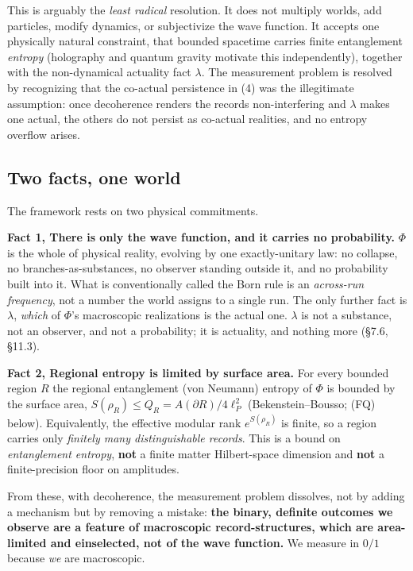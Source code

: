 \documentclass[11pt,a4paper]{article}
\begin{document}
This is arguably the \emph{least radical} resolution. It does not multiply worlds, add particles, modify dynamics, or subjectivize the wave function. It accepts one physically natural constraint, that bounded spacetime carries finite entanglement \emph{entropy} (holography and quantum gravity motivate this independently), together with the non-dynamical actuality fact $\lambda$. The measurement problem is resolved by recognizing that the co-actual persistence in (4) was the illegitimate assumption: once decoherence renders the records non-interfering and $\lambda$ makes one actual, the others do not persist as co-actual realities, and no entropy overflow arises.

\subsection{Two facts, one world}

The framework rests on two physical commitments.

\textbf{Fact 1, There is only the wave function, and it carries no probability.} $\Phi$ is the whole of physical reality, evolving by one exactly-unitary law: no collapse, no branches-as-substances, no observer standing outside it, and no probability built into it. What is conventionally called the Born rule is an \emph{across-run frequency}, not a number the world assigns to a single run. The only further fact is $\lambda$, \emph{which} of $\Phi$'s macroscopic realizations is the actual one. $\lambda$ is not a substance, not an observer, and not a probability; it is actuality, and nothing more (§7.6, §11.3).

\textbf{Fact 2, Regional entropy is limited by surface area.} For every bounded region $R$ the regional entanglement (von Neumann) entropy of $\Phi$ is bounded by the surface area, $S(\rho_R) \le Q_R = A(\partial R)/4\ell_P^2$ (Bekenstein–Bousso; (FQ) below). Equivalently, the effective modular rank $e^{S(\rho_R)}$ is finite, so a region carries only \emph{finitely many distinguishable records}. This is a bound on \emph{entanglement entropy}, \textbf{not} a finite matter Hilbert-space dimension and \textbf{not} a finite-precision floor on amplitudes.

From these, with decoherence, the measurement problem dissolves, not by adding a mechanism but by removing a mistake: \textbf{the binary, definite outcomes we observe are a feature of macroscopic record-structures, which are area-limited and einselected, not of the wave function.} We measure in $0/1$ because \emph{we} are macroscopic.
\end{document}
